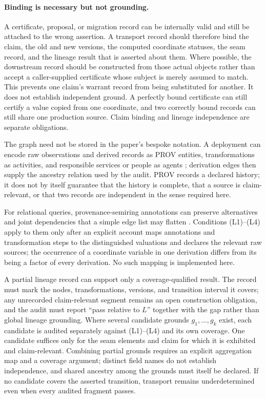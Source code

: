 \documentclass[11pt]{article}
\theoremstyle{definition}
\begin{document}
\paragraph{Binding is necessary but not grounding.}
A certificate, proposal, or migration record can be internally valid and still be attached to the wrong assertion. A transport record should therefore bind the claim, the old and new versions, the computed coordinate statuses, the seam record, and the lineage result that is asserted about them. Where possible, the downstream record should be constructed from those actual objects rather than accept a caller-supplied certificate whose subject is merely assumed to match. This prevents one claim's warrant record from being substituted for another. It does not establish independent ground. A perfectly bound certificate can still certify a value copied from one coordinate, and two correctly bound records can still share one production source. Claim binding and lineage independence are separate obligations.

The graph need not be stored in the paper's bespoke notation. A deployment can encode raw observations and derived records as PROV entities, transformations as activities, and responsible services or people as agents \citep{w3cprovdm2013}; derivation edges then supply the ancestry relation used by the audit. PROV records a declared history; it does not by itself guarantee that the history is complete, that a source is claim-relevant, or that two records are independent in the sense required here.

For relational queries, provenance-semiring annotations can preserve alternatives and joint dependencies that a simple edge list may flatten \citep{greenkarvounarakistannen2007}. Conditions (L1)--(L4) apply to them only after an explicit account maps annotations and transformation steps to the distinguished valuations and declares the relevant raw sources; the occurrence of a coordinate variable in one derivation differs from its being a factor of every derivation. No such mapping is implemented here.

A partial lineage record can support only a coverage-qualified result. The record must mark the nodes, transformations, versions, and transition interval it covers; any unrecorded claim-relevant segment remains an open construction obligation, and the audit must report ``pass relative to $L$'' together with the gap rather than global lineage grounding. Where several candidate grounds $g_1,\ldots,g_k$ exist, each candidate is audited separately against (L1)--(L4) and its own coverage. One candidate suffices only for the seam elements and claim for which it is exhibited and claim-relevant. Combining partial grounds requires an explicit aggregation map and a coverage argument; distinct field names do not establish independence, and shared ancestry among the grounds must itself be declared. If no candidate covers the asserted transition, transport remains underdetermined even when every audited fragment passes.
\end{document}

